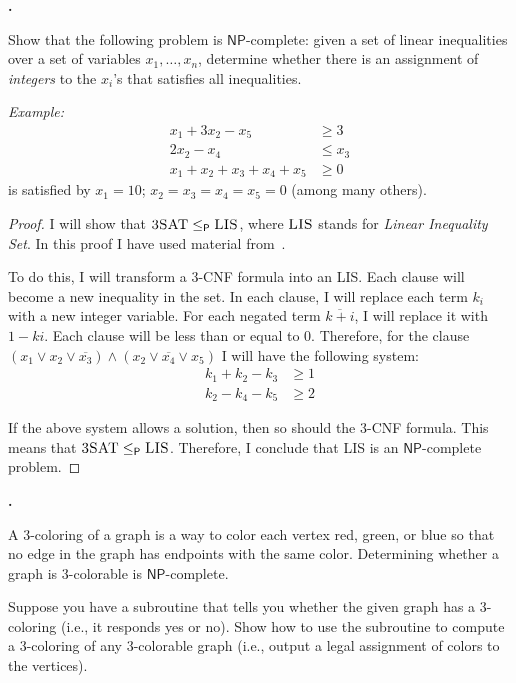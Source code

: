 \documentclass[letterpaper,11pt]{article}
\newcommand{\cc}[1]{\ensuremath{\textsf{#1}}\xspace}
\newcommand{\NP}{\cc{NP}}
\newcommand{\karp}{\le_{\textsf{P}}}
\newcounter{problem}
\newenvironment{problem}%
{%
	\stepcounter{problem}%
	\textbf{\theproblem.}
	\large
}{\\}%
\begin{document}
\begin{problem}
Show that the following problem is \NP-complete: given a set of linear inequalities over a set of variables $x_1, \ldots, x_n$, determine whether there is an assignment of {\em integers} to the $x_i$'s that satisfies all inequalities.

{\em Example:}
\begin{align*}
    x_1 + 3x_2 - x_5 &\ge 3 \\
    2x_2 - x_4 &\le x_3 \\
    x_1 + x_2 + x_3 + x_4 + x_5 &\ge 0
\end{align*}
is satisfied by $x_1 = 10$; $x_2 = x_3 = x_4 = x_5 = 0$ (among many others).
\end{problem}

\begin{proof}
I will show that $\textsc{3SAT} \karp \textsc{LIS}$, where $\textsc{LIS}$ stands for {\it Linear Inequality Set}.
In this proof I have used material from~\cite{clasical}.

To do this, I will transform a 3-{\sc CNF} formula into an {\sc LIS}.
Each clause will become a new inequality in the set.
In each clause, I will replace each term $k_{i}$ with a new integer variable.
For each negated term $\overline{k+{i}}$, I will replace it with $1-k{i}$.
Each clause will be less than or equal to 0.
Therefore, for the clause $(x_{1} \vee x_{2} \vee \overline{x_{3}}) \wedge (x_{2} \vee \overline{x_{4}} \vee x_{5})$ I will have the following system:
%
\begin{align*}
	k_{1} + k_{2} - k_{3} &\ge 1 \\
	k_{2} - k_{4} - k_{5} &\ge 2 
\end{align*}

If the above system allows a solution, then so should the 3-{\sc CNF} formula.
This means that $\textsc{3SAT} \karp \textsc{LIS}$.
Therefore, I conclude that {\sc LIS} is an $\NP$-complete problem.

\end{proof}

\begin{problem}
A 3-coloring of a graph is a way to color each vertex red, green, or blue so that no edge in the graph has endpoints with the same color. Determining whether a graph is 3-colorable is \NP-complete.

Suppose you have a subroutine that tells you whether the given graph has a 3-coloring (i.e., it responds {\sc yes} or {\sc no}). Show how to use the subroutine to compute a 3-coloring of any 3-colorable graph (i.e., output a legal assignment of colors to the vertices).
\end{problem}
\end{document}
